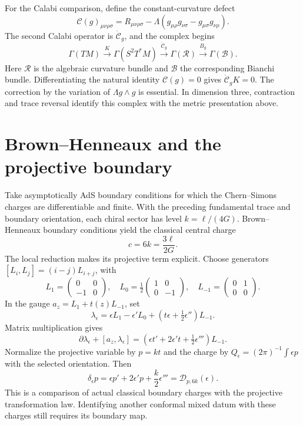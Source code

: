 For the Calabi comparison, define the constant-curvature defect
\[
 \mathcal C(g)_{\mu\nu\rho\sigma}
 =R_{\mu\nu\rho\sigma}
  -\Lambda(g_{\mu\rho}g_{\nu\sigma}-g_{\mu\sigma}g_{\nu\rho}).
\]
The second Calabi operator is $\dot{\mathcal C}_g$, and the complex begins
\[
 \Gamma(TM)\xrightarrow K\Gamma(S^2T^*M)
 \xrightarrow{\dot{\mathcal C}_g}\Gamma(\mathcal R)
 \xrightarrow{B_g}\Gamma(\mathcal B).
\]
Here $\mathcal R$ is the algebraic curvature bundle and $\mathcal B$ the
corresponding Bianchi bundle. Differentiating the natural identity
$\mathcal C(g)=0$ gives $\dot{\mathcal C}_gK=0$. The correction by the
variation of $\Lambda g\wedge g$ is essential. In dimension three, contraction
and trace reversal identify this complex with the metric presentation above.

\section{Brown--Henneaux and the projective boundary}
Take asymptotically AdS boundary conditions for which the Chern--Simons
charges are differentiable and finite. With the preceding fundamental
trace and boundary orientation, each chiral sector has level
$k=\ell/(4G)$. Brown--Henneaux boundary conditions yield the classical
central charge \cite{BrownHenneaux}
\[
 c=6k=\frac{3\ell}{2G}.
\]
The local reduction makes its projective term explicit. Choose generators
$[L_i,L_j]=(i-j)L_{i+j}$, with
\[
 L_1=\begin{pmatrix}0&0\\-1&0\end{pmatrix},\quad
 L_0=\tfrac12\begin{pmatrix}1&0\\0&-1\end{pmatrix},\quad
 L_{-1}=\begin{pmatrix}0&1\\0&0\end{pmatrix}.
\]
In the gauge $a_z=L_1+t(z)L_{-1}$, set
\[
 \lambda_\epsilon=\epsilon L_1-\epsilon'L_0
                    +(t\epsilon+\tfrac12\epsilon'')L_{-1}.
\]
Matrix multiplication gives
\[
 \partial\lambda_\epsilon+[a_z,\lambda_\epsilon]
   =(\epsilon t'+2\epsilon't+\tfrac12\epsilon''')L_{-1}.
\]
Normalize the projective variable by $p=kt$ and the charge by
$Q_\epsilon=(2\pi)^{-1}\int\epsilon p$ with the selected orientation.
Then
\[
 \delta_\epsilon p=\epsilon p'+2\epsilon'p+\frac k2\epsilon'''
                  =\mathcal D_{p,6k}(\epsilon).
\]
This is a comparison of actual classical boundary charges with the
projective transformation law. Identifying another conformal mixed datum
with these charges still requires its boundary map.

